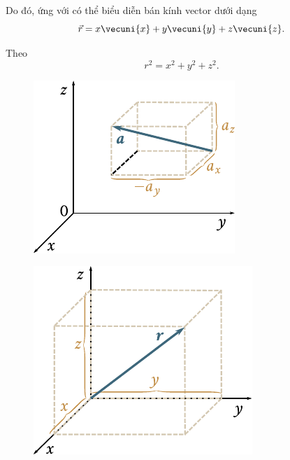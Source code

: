 \noindent
Do đó, ứng với  có thể biểu diễn bán kính vector dưới dạng
\begin{equation}\label{eq:1_13}
\vec{r} = x\vecuni{x} + y\vecuni{y} + z\vecuni{z}.
\end{equation}

\noindent
Theo 
\begin{equation}\label{eq:1_14}
r^2 = x^2 + y^2 + z^2.
\end{equation}

\begin{figure}[!htb]
	\begin{minipage}[t]{0.5\linewidth}
		\begin{center}
			\includegraphics[scale=1]{figures/ch_01/fig_1_13.pdf}
			\caption[]{}
			\label{fig:1_13}
		\end{center}
	\end{minipage}
	\hfill{ }%
	\begin{minipage}[t]{0.5\linewidth}
		\begin{center}
			\includegraphics[scale=0.95]{figures/ch_01/fig_1_14.pdf}
			\caption[]{}
			\label{fig:1_14}
		\end{center}
	\end{minipage}
\end{figure}

